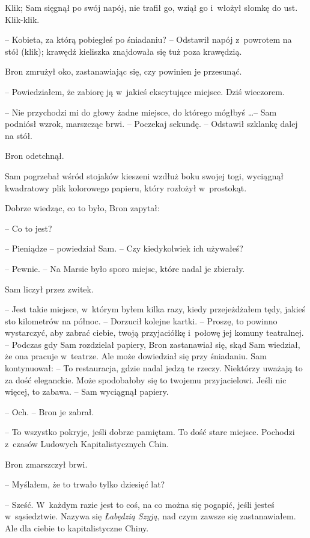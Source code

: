 \documentclass[oneside,polish,11pt,rmheadings]{mwbk}
\begin{document}
Klik; Sam sięgnął po swój napój, nie trafił go, wziął go i~włożył słomkę do ust.  Klik-klik. 

-- Kobieta, za którą pobiegłeś po śniadaniu? -- Odstawił napój z~powrotem na stół (klik); krawędź kieliszka znajdowała się tuż poza krawędzią. 

Bron zmrużył oko, zastanawiając się, czy powinien je przesunąć. 

-- Powiedziałem, że zabiorę ją w~jakieś ekscytujące miejsce. Dziś wieczorem.  

-- Nie przychodzi mi do głowy żadne miejsce, do którego mógłbyś \ldots  -- Sam podniósł wzrok, marszcząc brwi. -- Poczekaj sekundę. -- Odstawił szklankę dalej na stół. 

Bron odetchnął. 

Sam pogrzebał wśród stojaków kieszeni wzdłuż boku swojej togi, wyciągnął kwadratowy plik kolorowego papieru, który rozłożył w~prostokąt. 

Dobrze wiedząc, co to było, Bron zapytał: 

-- Co to jest? 

-- Pieniądze -- powiedział Sam. -- Czy kiedykolwiek ich używałeś? 

-- Pewnie. -- Na Marsie było sporo miejsc, które nadal je zbierały. 

Sam liczył przez zwitek. 

-- Jest takie miejsce, w~którym byłem kilka razy, kiedy przejeżdżałem tędy, jakieś sto kilometrów na północ. -- Dorzucił kolejne kartki. -- Proszę, to powinno wystarczyć, aby zabrać ciebie, twoją przyjaciółkę i~połowę jej komuny teatralnej. -- Podczas gdy Sam rozdzielał papiery, Bron zastanawiał się, skąd Sam wiedział, że ona pracuje w~teatrze. Ale może dowiedział się przy śniadaniu. Sam kontynuował: -- To restauracja, gdzie nadal jedzą te rzeczy. Niektórzy uważają to za dość eleganckie. Może spodobałoby się to twojemu przyjacielowi. Jeśli nic więcej, to zabawa. -- Sam wyciągnął papiery. 

-- Och. -- Bron je zabrał. 

-- To wszystko pokryje, jeśli dobrze pamiętam. To dość stare miejsce. Pochodzi z~czasów Ludowych Kapitalistycznych Chin. 

Bron zmarszczył brwi. 

-- Myślałem, że to trwało tylko dziesięć lat? 

-- Sześć. W~każdym razie jest to coś, na co można się pogapić, jeśli jesteś w~sąsiedztwie. Nazywa się \textit{Łabędzią Szyją}, nad czym zawsze się zastanawiałem. Ale dla ciebie to kapitalistyczne Chiny. 
\end{document}
